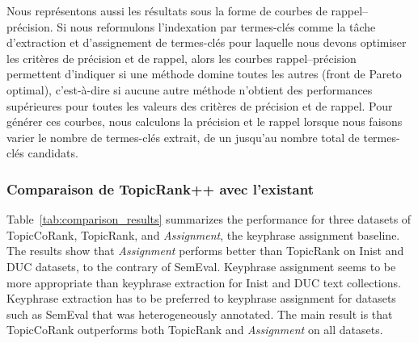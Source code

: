         Nous représentons aussi les résultats sous la forme de courbes de
        rappel--précision. Si nous reformulons l'indexation par termes-clés
        comme la tâche d'extraction et d'assignement de termes-clés pour
        laquelle nous devons optimiser les critères de précision et de rappel,
        alors les courbes rappel--précision permettent d'indiquer si une méthode
        domine toutes les autres (front de Pareto optimal), c'est-à-dire si
        aucune autre méthode n'obtient des performances supérieures pour toutes
        les valeurs des critères de précision et de rappel. Pour générer ces
        courbes, nous calculons la précision et le rappel lorsque nous faisons
        varier le nombre de termes-clés extrait, de un jusqu'au nombre total de
        termes-clés candidats.
      
      \subsubsection{Comparaison de TopicRank++ avec l'existant}
      \label{subsubsec:main-automatic_keyphrase_annotation-supervised_automatic_keyphrase_annotation-evaluation-comparison}
        Table~\ref{tab:comparison_results} summarizes the performance for three datasets of TopicCoRank,  TopicRank, and \textit{Assignment}, the keyphrase assignment baseline.
        The results show that \textit{Assignment} performs better than TopicRank on Inist and DUC datasets, to the contrary of
        SemEval. 
        Keyphrase assignment seems to be more appropriate than keyphrase extraction for Inist and DUC text collections.
        Keyphrase extraction has to be preferred to keyphrase assignment for datasets such as SemEval that was heterogeneously annotated. 
        The main result is that TopicCoRank outperforms both TopicRank and \textit{Assignment} on all
        datasets. 
    
